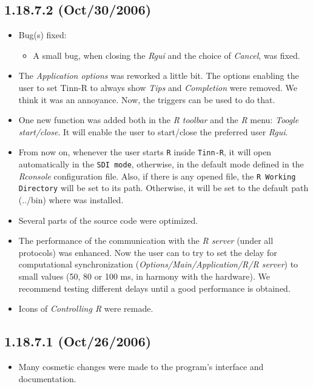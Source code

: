 \subsection*{1.18.7.2 (Oct/30/2006)}
\begin{itemize}
  \item Bug(s) fixed:
    \begin{itemize}
      \item A small bug, when closing the \textit{Rgui} and the choice
        of \textit{Cancel}, was fixed.
    \end{itemize}
  \item The \textit{Application options} was reworked a little bit. The
    options enabling the user to set Tinn-R to always show \textit{Tips}
    and \textit{Completion} were removed. We think it was an annoyance.
    Now, the triggers can be used to do that.
  \item One new function was added both in the \textit{R toolbar} and the
    \textit{R} menu: \textit{Toogle start/close}. It will enable the user
    to start/close the preferred user \textit{Rgui}.
  \item From now on, whenever the user starts \texttt{R} inside
    \texttt{Tinn-R}, it will open automatically in the \texttt{SDI mode},
    otherwise, in the default mode defined in the \textit{Rconsole}
    configuration file. Also, if there is any opened file, the
    \texttt{R Working Directory} will be set to its path. Otherwise,
    it will be set to the default path (../bin) where \RR{} was installed.
  \item Several parts of the source code were optimized.
  \item The performance of the communication with the \textit{R server}
    (under all protocols) was enhanced. Now the user can to try to set
    the delay for computational synchronization
    (\textit{Options/Main/Application/R/R server}) to small values
    (50, 80 or 100 ms, in harmony with the hardware). We recommend
    testing different delays until a good performance is obtained.
  \item Icons of \textit{Controlling R} were remade.
\end{itemize}


\subsection*{1.18.7.1 (Oct/26/2006)}
\begin{itemize}
  \item Many cosmetic changes were made to the program's interface
    and documentation.
\end{itemize}


